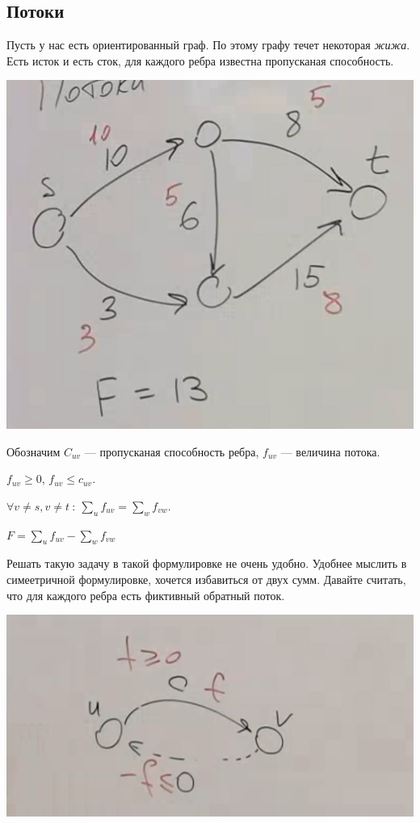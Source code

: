 \subsection{Потоки}
Пусть у нас есть ориентированный граф. 
По этому графу течет некоторая \textit{жижа}.
Есть исток и есть сток, для каждого ребра известна пропусканая способность.

\begin{center}
    \includegraphics[scale=0.8]{img/flows_ex1.png}
\end{center}

Обозначим $C_{uv}$ --- пропусканая способность ребра, $f_{uv}$ --- величина потока.

$f_{uv} \geqslant 0$, $f_{uv} \leqslant c_{uv}$.

$\forall v \neq s, v \neq t ~:~ \sum\limits_u f_{uv} = \sum\limits_w f_{vw}$.

$F = \sum\limits_u f_{uv} - \sum\limits_w f_{vw}$

Решать такую задачу в такой формулировке не очень удобно. Удобнее мыслить в симеетричной формулировке, хочется избавиться от двух сумм. Давайте считать, что для каждого ребра есть фиктивный обратный поток.

\begin{center}
    \includegraphics[scale=0.8]{img/flows_ex2.png}
\end{center}


